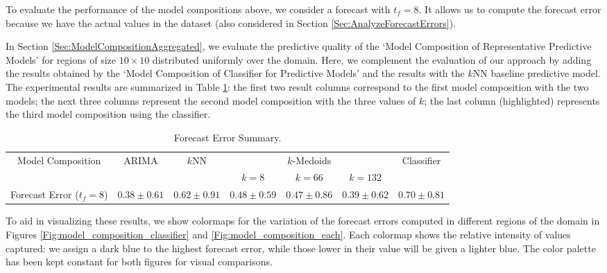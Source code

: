 To evaluate the performance of the model compositions above, we consider a forecast with $t_{f} = 8$. It allows us to compute the forecast error because we have the actual values in the dataset (also considered in Section \ref{Sec:AnalyzeForecastErrors}). 

In Section \ref{Sec:ModelCompositionAggregated}, we evaluate the predictive quality of the `Model Composition of Representative Predictive Models' for regions of size $10 \times 10$ distributed uniformly over the domain. Here, we complement the evaluation of our approach by adding the results obtained by the `Model Composition of Classifier for Predictive Models' and the results with the $k$NN baseline predictive model. The experimental results are summarized in Table \ref{Table:Query10x10_Classfier_Point_Each_StatSummary}: the first two result columns correspond to the first model composition with the two models; the next three columns represent the second model composition with the three values of $k$; the last column (highlighted) represents the third model composition using the classifier.

\begin{table}[h!]
	\centering
	\tiny
	\begin{tabular}{|c|c|c|c|c|c|c|}
	    \hline
        \multirow{2}{*}{Model Composition} & \multirow{2}{*}{ARIMA} & \multirow{2}{*}{$k$NN} & \multicolumn{3}{c|}{$k$-Medoids} & \multirow{2}{*}{Classifier}  \\
        \cline{4-6}
        & & & $k = 8$ & $k = 66$ & $k = 132$ &  \\
        \hline
        Forecast Error ($t_{f}=8$) & $0.38 \pm 0.61$ & $0.62 \pm 0.91$ & $0.48 \pm 0.59$ & $0.47 \pm 0.86$ & $0.39 \pm 0.62$ & \cellcolor{red!20}$0.70 \pm 0.81$ \\
        \hline
	\end{tabular}
	\caption{Forecast Error Summary.}
	\label{Table:Query10x10_Classfier_Point_Each_StatSummary}
\end{table}

To aid in visualizing these results, we show colormaps for the variation of the forecast errors computed in different regions of the domain in Figures \ref{Fig:model_composition_classifier} and \ref{Fig:model_composition_each}. Each colormap shows the relative intensity of values captured: we assign a dark blue to the highest forecast error, while those lower in their value will be given a lighter blue. The color palette has been kept constant for both figures for visual comparisons.

